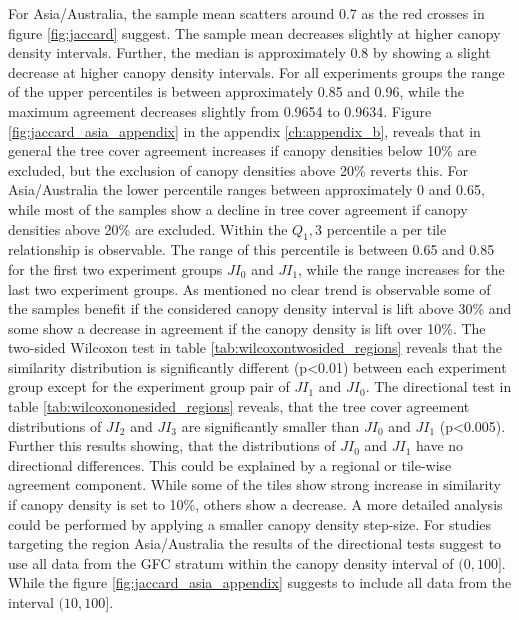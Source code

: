 			For Asia/Australia, the sample mean scatters around 0.7 as the red crosses in figure \ref{fig:jaccard} suggest. The sample mean decreases slightly at higher canopy density intervals. Further, the median is approximately 0.8 by showing a slight decrease at higher canopy density intervals. For all experiments groups the range of the upper percentiles is between approximately 0.85 and 0.96, while the maximum agreement decreases slightly from 0.9654 to 0.9634. Figure \ref{fig:jaccard_asia_appendix} in the appendix \ref{ch:appendix_b}, reveals that in general the tree cover agreement increases if canopy densities below 10\% are excluded, but the exclusion of canopy densities above 20\% reverts this. For Asia/Australia the lower percentile ranges between approximately 0 and 0.65, while most of the samples show a decline in tree cover agreement if canopy densities above 20\% are excluded. Within the $Q_1,3$ percentile a per tile relationship is observable. The range of this percentile is between 0.65 and 0.85 for the first two experiment groups $JI_0$ and $JI_1$, while the range increases for the last two experiment groups. As mentioned no clear trend is observable some of the samples benefit if the considered canopy density interval is lift above 30\% and some show a decrease in agreement if the canopy density is lift over 10\%. The two-sided Wilcoxon test in table \ref{tab:wilcoxontwosided_regions} reveals that the similarity distribution is significantly different (p<0.01) between each experiment group except for the experiment group pair of $JI_1$ and $JI_0$. The directional test in table \ref{tab:wilcoxononesided_regions} reveals, that the tree cover agreement distributions of $JI_2$ and $JI_3$ are significantly smaller than $JI_0$ and $JI_1$ (p<0.005). Further this results showing, that the distributions of $JI_0$ and $JI_1$ have no directional differences. This could be explained by a regional or tile-wise agreement component. While some of the tiles show strong increase in similarity if canopy density is set to 10\%, others show a decrease. A more detailed analysis could be performed by applying a smaller canopy density step-size. For studies targeting the region Asia/Australia the results of the directional tests suggest to use all data from the \ac{GFC} stratum within the canopy density interval of $(0,100]$. While the figure \ref{fig:jaccard_asia_appendix} suggests to include all data from the interval $(10,100]$.


